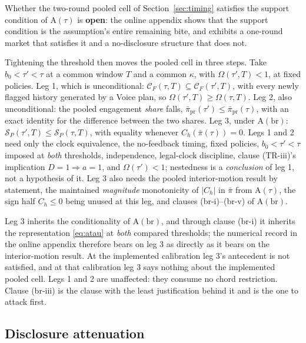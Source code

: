 \documentclass[11pt]{article}
\makeatletter
\newcommand{\compatlabel}[2]{\begingroup\phantomsection\def\@currentlabel{#1}\label{#2}\endgroup}
\newcommand{\Atau}{\mathrm{A}(\tau)}
\newcommand{\Abr}{\mathrm{A}(\mathrm{br})}
\makeatother
\begin{document}
Whether the two-round pooled cell of Section~\ref{sec:timing} satisfies the support condition of
$\Atau$ is \textbf{open}: the online appendix shows that the support condition is the assumption's
entire remaining bite, and exhibits a one-round market that satisfies it and a no-disclosure
structure that does not.

Tightening the threshold then moves the pooled cell in three steps. Take $b_0<\tau'<\tau$ at a common
window $T$ and a common $\kappa$, with $\Omega(\tau',T)<1$, at fixed policies. Leg 1, which is
unconditional: $\mathcal C_F(\tau,T)\subseteq\mathcal C_F(\tau',T)$, with every newly flagged history
generated by a Voice plan, so $\Omega(\tau',T)\geq\Omega(\tau,T)$. Leg 2, also unconditional: the
pooled engagement \emph{share} falls, $\bar\pi_{\mathrm{pr}}(\tau')\leq\bar\pi_{\mathrm{pr}}(\tau)$,
with an exact identity for the difference between the two shares. Leg 3, under $\Abr$:
$\mathcal S_P(\tau',T)\leq\mathcal S_P(\tau,T)$, with equality whenever $C_h(\bar\pi(\tau))=0$. Legs
1 and 2 need only the clock equivalence, the no-feedback timing, fixed policies, $b_0<\tau'<\tau$
imposed at \emph{both} thresholds, independence, legal-clock discipline, clause (TR-iii)'s
implication $D=1\Rightarrow a=1$, and $\Omega(\tau')<1$; nestedness is a \emph{conclusion} of leg 1,
not a hypothesis of it. Leg 3 also needs the pooled interior-motion result by statement, the
maintained \emph{magnitude} monotonicity of $|C_h|$ in $\bar\pi$ from $\Atau$, the sign half
$C_h\leq0$ being unused at this leg, and clauses (br-i)--(br-v) of
$\Abr$.\compatlabel{5}{lem:L4}

Leg 3 inherits the conditionality of $\Abr$, and through clause (br-i) it inherits the representation
\eqref{eq:atau} at \emph{both} compared thresholds; the numerical record in the online appendix
therefore bears on leg 3 as directly as it bears on the interior-motion result. At the implemented
calibration leg 3's antecedent is not satisfied, and at that calibration leg 3 says nothing about the
implemented pooled cell. Legs 1 and 2 are unaffected: they consume no chord restriction. Clause
(br-iii) is the clause with the least justification behind it and is the one to attack first.

\subsection{Disclosure attenuation}
\label{sec:attenuation}
\end{document}

